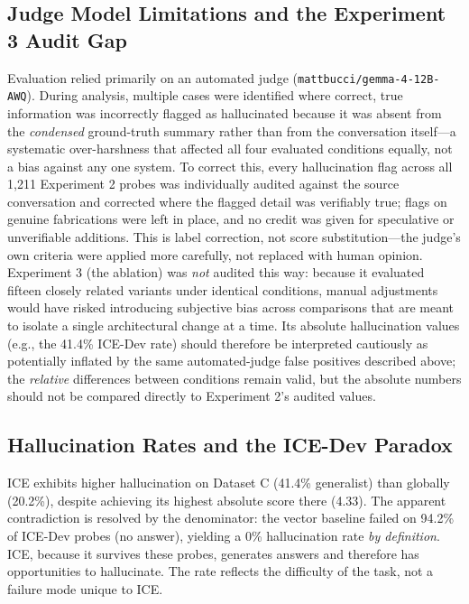 \documentclass[10pt]{article}
\begin{document}
\subsection{Judge Model Limitations and the Experiment 3 Audit Gap}
Evaluation relied primarily on an automated judge (\texttt{mattbucci/gemma-4-12B-AWQ}). During analysis, multiple cases were identified where correct, true information was incorrectly flagged as hallucinated because it was absent from the \emph{condensed} ground-truth summary rather than from the conversation itself---a systematic over-harshness that affected all four evaluated conditions equally, not a bias against any one system. To correct this, every hallucination flag across all 1{,}211 Experiment 2 probes was individually audited against the source conversation and corrected where the flagged detail was verifiably true; flags on genuine fabrications were left in place, and no credit was given for speculative or unverifiable additions. This is label correction, not score substitution---the judge's own criteria were applied more carefully, not replaced with human opinion. Experiment 3 (the ablation) was \emph{not} audited this way: because it evaluated fifteen closely related variants under identical conditions, manual adjustments would have risked introducing subjective bias across comparisons that are meant to isolate a single architectural change at a time. Its absolute hallucination values (e.g., the 41.4\% ICE-Dev rate) should therefore be interpreted cautiously as potentially inflated by the same automated-judge false positives described above; the \emph{relative} differences between conditions remain valid, but the absolute numbers should not be compared directly to Experiment 2's audited values.

\subsection{Hallucination Rates and the ICE-Dev Paradox}
ICE exhibits higher hallucination on Dataset C (41.4\% generalist) than globally (20.2\%), despite achieving its highest absolute score there (4.33). The apparent contradiction is resolved by the denominator: the vector baseline failed on 94.2\% of ICE-Dev probes (no answer), yielding a 0\% hallucination rate \emph{by definition}. ICE, because it survives these probes, generates answers and therefore has opportunities to hallucinate. The rate reflects the difficulty of the task, not a failure mode unique to ICE.
\end{document}
